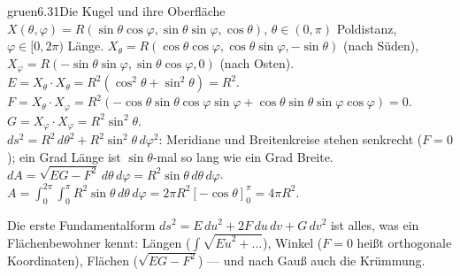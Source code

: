 \begin{loesungkarte}{gruen}{6.31}{Die Kugel und ihre Oberfläche}
$X(\theta, \varphi) = R(\sin\theta\cos\varphi, \sin\theta\sin\varphi, \cos\theta)$, $\theta\in(0, \pi)$ Poldistanz, $\varphi\in[0, 2\pi)$ Länge.
$X_\theta = R(\cos\theta\cos\varphi, \cos\theta\sin\varphi, -\sin\theta)$ (nach Süden), $X_\varphi = R(-\sin\theta\sin\varphi, \sin\theta\cos\varphi, 0)$ (nach Osten).
$E = X_\theta\cdot X_\theta = R^{2}(\cos^{2}\theta + \sin^{2}\theta) = R^{2}$. $F = X_\theta\cdot X_\varphi = R^{2}(-\cos\theta\sin\theta\cos\varphi\sin\varphi + \cos\theta\sin\theta\sin\varphi\cos\varphi) = 0$. $G = X_\varphi\cdot X_\varphi = R^{2}\sin^{2}\theta$. \\
$ds^{2} = R^{2}\,d\theta^{2} + R^{2}\sin^{2}\theta\,d\varphi^{2}$: Meridiane und Breitenkreise stehen senkrecht ($F = 0$); ein Grad Länge ist $\sin\theta$-mal so lang wie ein Grad Breite.
$dA = \sqrt{EG - F^{2}}\,d\theta\,d\varphi = R^{2}\sin\theta\,d\theta\,d\varphi$. $A = \int_0^{2\pi}\!\!\int_0^{\pi}R^{2}\sin\theta\,d\theta\,d\varphi = 2\pi R^{2}[-\cos\theta]_0^{\pi} = 4\pi R^{2}$.
\begin{mitnehmen}\kastentext
Die erste Fundamentalform $ds^{2} = E\,du^{2} + 2F\,du\,dv + G\,dv^{2}$ ist alles, was ein Flächenbewohner kennt: Längen ($\int\sqrt{E\dot u^{2} + \dots}$), Winkel ($F = 0$ heißt orthogonale Koordinaten), Flächen ($\sqrt{EG - F^{2}}$) --- und nach Gauß auch die Krümmung.
\end{mitnehmen}
\end{loesungkarte}

